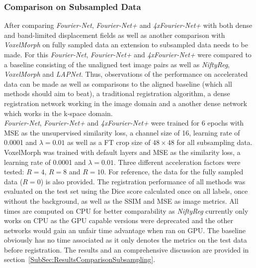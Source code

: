 \subsubsection{Comparison on Subsampled Data} \label{SubSubSec:ComparisonSubsampling}
After comparing \emph{Fourier-Net}, \emph{Fourier-Net+} and \emph{4xFourier-Net+} with both dense and band-limited displacement fields as well as another comparison with \emph{VoxelMorph} on fully sampled data 
an extension to subsampled data needs to be made. For this \emph{Fourier-Net}, \emph{Fourier-Net+} and \emph{4xFourier-Net+} were compared to a baseline consisting of the unaligned test image pairs as well as \emph{NiftyReg}, \emph{VoxelMorph} and \emph{LAPNet}. Thus, observations of the performance on accelerated data can be made as well as comparisons to the aligned baseline (which all methods should aim to beat), a traditional registration algorithm, a dense registration network working in the image domain and a another dense network which works in the k-space domain.\\
\emph{Fourier-Net}, \emph{Fourier-Net+} and \emph{4xFourier-Net+} were trained for 6 epochs with MSE as the unsupervised similarity loss, a channel size of 16, learning rate of 0.0001 and $\lambda=0.01$ as well as a FT crop size of $48 \times 48$ for all subsampling data. VoxelMorph was trained with default layers and MSE as the similarity loss, a learning rate of 0.0001 and $\lambda=0.01$. Three different acceleration factors were tested: $R=4$, $R=8$ and $R=10$. For reference, the data for the fully sampled data ($R=0$) is also provided. The registration performance of all methods was evaluated on the test set using the Dice score calculated once on all labels, once without the background, as well as the SSIM and MSE as image metrics. All times are computed on CPU for better comparability as \emph{NiftyReg} currently only works on CPU as the GPU capable versions were deprecated and the other networks would gain an unfair time advantage when ran on GPU. The baseline obviously has no time associated as it only denotes the metrics on the test data before registration. The results and an comprehensive discussion are provided in section~\ref{SubSec:ResultsComparisonSubsampling}.

